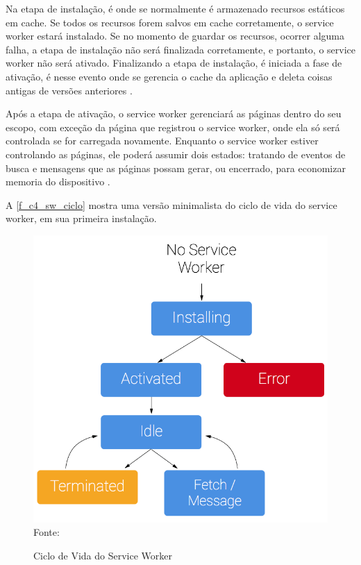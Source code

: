 Na etapa de instalação, é onde se normalmente é armazenado recursos estáticos em cache. Se todos os recursos forem salvos em cache corretamente, o service worker estará instalado. Se no momento de guardar os recursos, ocorrer alguma falha, a etapa de instalação não será finalizada corretamente, e portanto, o service worker não será ativado. Finalizando a etapa de instalação, é iniciada a fase de ativação, é nesse evento onde se gerencia o cache da aplicação e deleta coisas antigas de versões anteriores \cite{servicework}.

Após a etapa de ativação, o service worker gerenciará as páginas dentro do seu escopo, com exceção da página que registrou o service worker, onde ela só será controlada se for carregada novamente. Enquanto o service worker estiver controlando as páginas, ele poderá assumir dois estados: tratando de eventos de busca e mensagens que as páginas possam gerar, ou encerrado, para economizar memoria do dispositivo \cite{servicework}.


A \autoref{f_c4_sw_ciclo} mostra uma versão minimalista do ciclo de vida do service worker, em sua primeira instalação.

\begin{figure}[!htpb]
	\centering
	\caption{Ciclo de Vida do Service Worker}
	\includegraphics[scale=0.18]{images/sw-lifecycle.png}\\
	{\footnotesize Fonte:\cite{servicework}}
 	\label{f_c4_sw_ciclo}
\end{figure}

